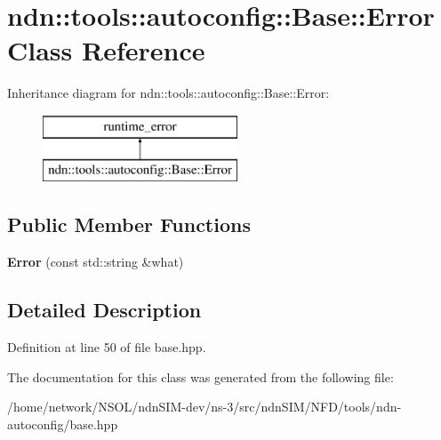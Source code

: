 \hypertarget{classndn_1_1tools_1_1autoconfig_1_1Base_1_1Error}{}\section{ndn\+:\+:tools\+:\+:autoconfig\+:\+:Base\+:\+:Error Class Reference}
\label{classndn_1_1tools_1_1autoconfig_1_1Base_1_1Error}
Inheritance diagram for ndn\+:\+:tools\+:\+:autoconfig\+:\+:Base\+:\+:Error\+:\begin{figure}[H]
\begin{center}
\leavevmode
\includegraphics[height=2.000000cm]{classndn_1_1tools_1_1autoconfig_1_1Base_1_1Error}
\end{center}
\end{figure}
\subsection*{Public Member Functions}
\begin{DoxyCompactItemize}
\item 
{\bfseries Error} (const std\+::string \&what)\hypertarget{classndn_1_1tools_1_1autoconfig_1_1Base_1_1Error_a10bbf1c98e9dc11473385473a77e3e64}{}\label{classndn_1_1tools_1_1autoconfig_1_1Base_1_1Error_a10bbf1c98e9dc11473385473a77e3e64}

\end{DoxyCompactItemize}


\subsection{Detailed Description}


Definition at line 50 of file base.\+hpp.



The documentation for this class was generated from the following file\+:\begin{DoxyCompactItemize}
\item 
/home/network/\+N\+S\+O\+L/ndn\+S\+I\+M-\/dev/ns-\/3/src/ndn\+S\+I\+M/\+N\+F\+D/tools/ndn-\/autoconfig/base.\+hpp\end{DoxyCompactItemize}
